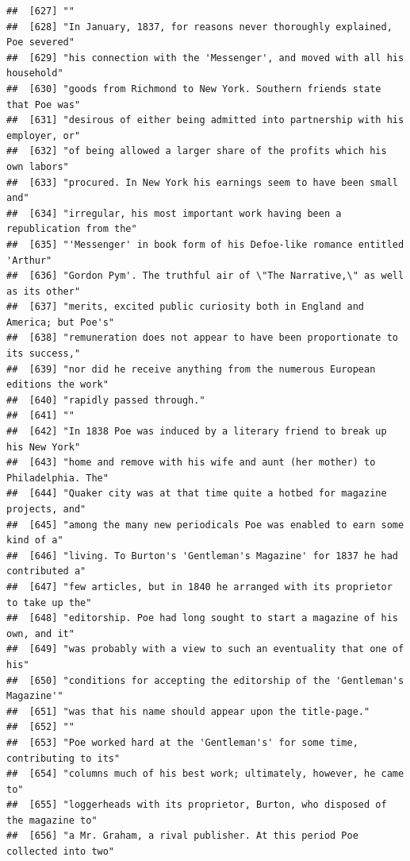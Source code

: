 \documentclass{article}\usepackage[]{graphicx}\usepackage[]{color}
\makeatletter
\newenvironment{kframe}{%
 \def\at@end@of@kframe{}%
 \ifinner\ifhmode%
  \def\at@end@of@kframe{\end{minipage}}%
  \begin{minipage}{\columnwidth}%
 \fi\fi%
 \def\FrameCommand##1{\hskip\@totalleftmargin \hskip-\fboxsep
 \colorbox{shadecolor}{##1}\hskip-\fboxsep
     \hskip-\linewidth \hskip-\@totalleftmargin \hskip\columnwidth}%
 \MakeFramed {\advance\hsize-\width
   \@totalleftmargin\z@ \linewidth\hsize
   \@setminipage}}%
 {\par\unskip\endMakeFramed%
 \at@end@of@kframe}
\newenvironment{knitrout}{}{} %
\makeatother
\begin{document}
\begin{knitrout}
\begin{kframe}
\begin{verbatim}
##  [627] ""                                                                            
##  [628] "In January, 1837, for reasons never thoroughly explained, Poe severed"       
##  [629] "his connection with the 'Messenger', and moved with all his household"       
##  [630] "goods from Richmond to New York. Southern friends state that Poe was"        
##  [631] "desirous of either being admitted into partnership with his employer, or"    
##  [632] "of being allowed a larger share of the profits which his own labors"         
##  [633] "procured. In New York his earnings seem to have been small and"              
##  [634] "irregular, his most important work having been a republication from the"     
##  [635] "'Messenger' in book form of his Defoe-like romance entitled 'Arthur"         
##  [636] "Gordon Pym'. The truthful air of \"The Narrative,\" as well as its other"    
##  [637] "merits, excited public curiosity both in England and America; but Poe's"     
##  [638] "remuneration does not appear to have been proportionate to its success,"     
##  [639] "nor did he receive anything from the numerous European editions the work"    
##  [640] "rapidly passed through."                                                     
##  [641] ""                                                                            
##  [642] "In 1838 Poe was induced by a literary friend to break up his New York"       
##  [643] "home and remove with his wife and aunt (her mother) to Philadelphia. The"    
##  [644] "Quaker city was at that time quite a hotbed for magazine projects, and"      
##  [645] "among the many new periodicals Poe was enabled to earn some kind of a"       
##  [646] "living. To Burton's 'Gentleman's Magazine' for 1837 he had contributed a"    
##  [647] "few articles, but in 1840 he arranged with its proprietor to take up the"    
##  [648] "editorship. Poe had long sought to start a magazine of his own, and it"      
##  [649] "was probably with a view to such an eventuality that one of his"             
##  [650] "conditions for accepting the editorship of the 'Gentleman's Magazine'"       
##  [651] "was that his name should appear upon the title-page."                        
##  [652] ""                                                                            
##  [653] "Poe worked hard at the 'Gentleman's' for some time, contributing to its"     
##  [654] "columns much of his best work; ultimately, however, he came to"              
##  [655] "loggerheads with its proprietor, Burton, who disposed of the magazine to"    
##  [656] "a Mr. Graham, a rival publisher. At this period Poe collected into two"      

\end{verbatim}
\end{kframe}
\end{knitrout}
\end{document}
